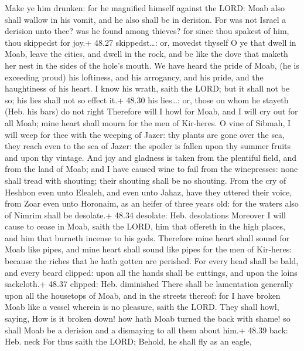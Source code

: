  Make ye him drunken: for he magnified himself against
the LORD: Moab also shall wallow in his vomit, and he also shall be in
derision.  For was not Israel a derision unto thee? was he
found among thieves? for since thou spakest of him, thou skippedst for
joy.+ 48.27 skippedst\ldots: or, movedst thyself  O ye that
dwell in Moab, leave the cities, and dwell in the rock, and be like the
dove that maketh her nest in the sides of the hole's mouth.
 We have heard the pride of Moab, (he is exceeding proud)
his loftiness, and his arrogancy, and his pride, and the haughtiness of
his heart.  I know his wrath, saith the LORD; but it shall
not be so; his lies shall not so effect it.+ 48.30 his lies\ldots: or,
those on whom he stayeth (Heb. his bars) do not right 
Therefore will I howl for Moab, and I will cry out for all Moab; mine
heart shall mourn for the men of Kir-heres.  O vine of
Sibmah, I will weep for thee with the weeping of Jazer: thy plants are
gone over the sea, they reach even to the sea of Jazer: the spoiler is
fallen upon thy summer fruits and upon thy vintage.  And
joy and gladness is taken from the plentiful field, and from the land of
Moab; and I have caused wine to fail from the winepresses: none shall
tread with shouting; their shouting shall be no shouting. 
From the cry of Heshbon even unto Elealeh, and even unto Jahaz, have
they uttered their voice, from Zoar even unto Horonaim, as an heifer of
three years old: for the waters also of Nimrim shall be desolate.+ 48.34
desolate: Heb. desolations  Moreover I will cause to cease
in Moab, saith the LORD, him that offereth in the high places, and him
that burneth incense to his gods.  Therefore mine heart
shall sound for Moab like pipes, and mine heart shall sound like pipes
for the men of Kir-heres: because the riches that he hath gotten are
perished.  For every head shall be bald, and every beard
clipped: upon all the hands shall be cuttings, and upon the loins
sackcloth.+ 48.37 clipped: Heb. diminished  There shall be
lamentation generally upon all the housetops of Moab, and in the streets
thereof: for I have broken Moab like a vessel wherein is no pleasure,
saith the LORD.  They shall howl, saying, How is it broken
down! how hath Moab turned the back with shame! so shall Moab be a
derision and a dismaying to all them about him.+ 48.39 back: Heb. neck
 For thus saith the LORD; Behold, he shall fly as an eagle,
